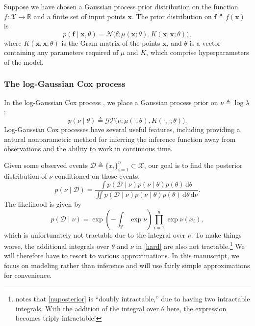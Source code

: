 \documentclass{article}
\newcommand{\deq}{\triangleq}
\newcommand{\cm}[1]{\mathcal{#1}}
\newcommand{\data}{\cm{D}}
\newcommand{\given}{\mid}
\newcommand{\R}{\mathbb{R}}
\newcommand{\intd}[1]{\,\mathrm{d}#1}
\begin{document}
Suppose we have chosen a Gaussian process prior distribution on the
function $f\colon \cm{X} \to \R$ and a finite set of input points
$\bm{x}$.  The prior distribution on $\bm{f} \deq f(\bm{x})$ is
\begin{equation*}
 p(\bm{f} \given \bm{x}, \theta)
 =
 \cm{N}
 \bigl(
   \bm{f};
   \mu(\bm{x}; \theta),
   K(\bm{x}, \bm{x}; \theta)
 \bigr),
\end{equation*}
where $K(\bm{x}, \bm{x}; \theta)$ is the Gram matrix of the points
$\bm{x}$, and $\theta$ is a vector containing any parameters required
of $\mu$ and $K$, which comprise hyperparameters of the model.

\subsubsection{The log-Gaussian Cox process}

In the log-Gaussian Cox process \citep{moller, diggle}, we place a
Gaussian process prior on $\nu \deq \log \lambda$:
\begin{equation*}
  p(\nu \given \theta) 
  \deq 
  \cm{GP}\bigl(\nu; \mu(\cdot; \theta), K(\cdot, \cdot; \theta)\bigr).
\end{equation*}
Log-Gaussian Cox processes have several useful features, including
providing a natural nonparametric method for inferring the inference
function away from observations and the ability to work in continuous
time.

Given some observed events $\data \deq \lbrace x_i \rbrace_{i=1}^n
\subset \cm{X}$, our goal is to find the posterior distribution of
$\nu$ conditioned on those events,
\begin{equation}
  \label{nuposterior}
  p(\nu \given \data)
  =
  \frac
  {
    \int p(\data \given \nu)
    p(\nu \given \theta)
    p(\theta) \intd{\theta}
  }
  {
    \iint p(\data \given \nu)
    p(\nu \given \theta) 
    p(\theta) 
    \intd{\theta} \intd{\nu}
  }.
\end{equation}
The likelihood is given by
\begin{equation}
  \label{hard}
  p(\data \given \nu) 
  =
  \exp\left( -\int_{\cm{V}} \exp \nu \right) \prod_{i = 1}^n \exp \nu(x_i),
\end{equation}
which is unfortunately not tractable due to the integral over $\nu$.
To make things worse, the additional integrals over $\theta$ and $\nu$
in \eqref{hard} are also not tractable.\footnote{\citep{adams} notes
  that \eqref{nuposterior} is ``doubly intractable,'' due to having
  two intractable integrals.  With the addition of the integral over
  $\theta$ here, the expression becomes triply intractable!}  We will
therefore have to resort to various approximations.  In this
manuscript, we focus on modeling rather than inference and will use
fairly simple approximations for convenience.
\end{document}
